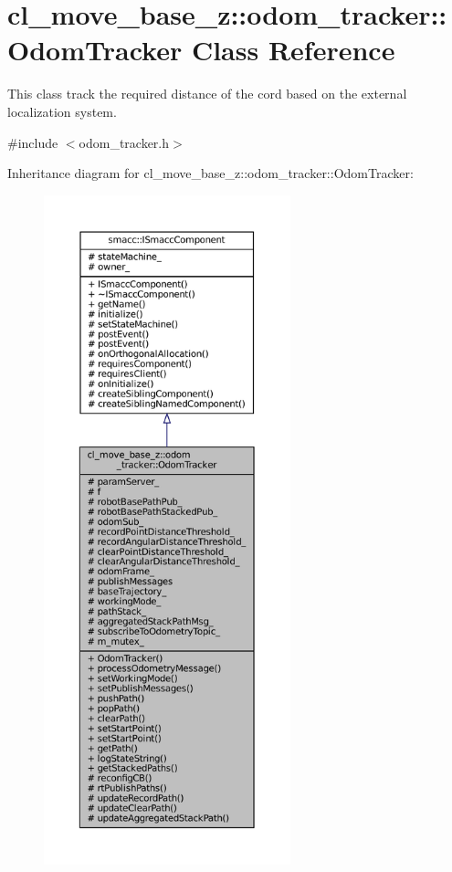 \hypertarget{classcl__move__base__z_1_1odom__tracker_1_1OdomTracker}{}\section{cl\+\_\+move\+\_\+base\+\_\+z\+:\+:odom\+\_\+tracker\+:\+:Odom\+Tracker Class Reference}
\label{classcl__move__base__z_1_1odom__tracker_1_1OdomTracker}


This class track the required distance of the cord based on the external localization system.  




{\ttfamily \#include $<$odom\+\_\+tracker.\+h$>$}



Inheritance diagram for cl\+\_\+move\+\_\+base\+\_\+z\+:\+:odom\+\_\+tracker\+:\+:Odom\+Tracker\+:
\nopagebreak
\begin{figure}[H]
\begin{center}
\leavevmode
\includegraphics[height=550pt]{classcl__move__base__z_1_1odom__tracker_1_1OdomTracker__inherit__graph}
\end{center}
\end{figure}


